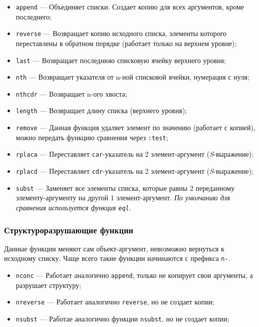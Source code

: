 \begin{itemize}
	\item \texttt{append} --- Объединяет списки. Создает копию для всех аргументов, кроме последнего;
	
	\item \texttt{reverse} --- Возвращает копию исходного списка, элементы которого переставлены в обратном порядке (работает только на верхнем уровне);
	
	\item \texttt{last} --- Возвращает последнюю списковую ячейку верхнего уровня;
	
	\item \texttt{nth} --- Возвращает указателя от n-ной списковой ячейки, нумерация с нуля;
	
	\item \texttt{nthcdr} --- Возвращает n-ого хвоста;
	
	\item \texttt{length} --- Возвращает длину списка (верхнего уровня);
	
	\item \texttt{remove} --- Данная функция удаляет элемент по значению (работает с копией), можно передать функцию сравнения через \texttt{:test};
	
	\item \texttt{rplaca} --- Переставляет \texttt{car}-указатель на 2 элемент-аргумент (\textit{S}-выражение);
	
	\item \texttt{rplacd} --- Переставляет \texttt{cdr}-указатель на 2 элемент-аргумент (\textit{S}-выражение);
	
	\item \texttt{subst} --- Заменяет все элементы списка, которые равны 2 переданному элементу-аргументу на другой 1 элемент-аргумент. \textit{По умолчанию для сравнения используется функция \texttt{eql}}.	
\end{itemize}

\subsubsection*{Структуроразрушающие функции}

Данные функции меняют сам объект-аргумент, невозможно вернуться к исходному списку. Чаще всего такие функции начинаются с префикса \texttt{n-}.

\begin{itemize}
	\item \texttt{nconc} --- Работает аналогично \texttt{append}, только не копирует свои аргументы, а разрушает структуру;
	
	\item \texttt{nreverse} --- Работает аналогично \texttt{reverse}, но не создает копии;
	
	\item \texttt{nsubst} --- Работае аналогично функции \texttt{nsubst}, но не создает копии;
	
\end{itemize}


